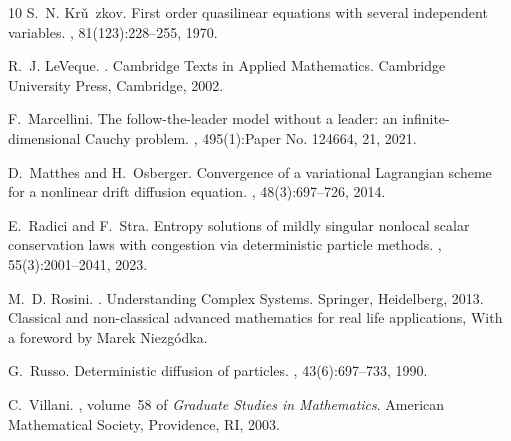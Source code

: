 \documentclass[reqno,oneside]{amsart}
\theoremstyle{plain}
\begin{document}
\begin{thebibliography}{10}
S.~N. Kru\v~zkov.
\newblock First order quasilinear equations with several independent variables.
, 81(123):228--255, 1970.

R.~J. LeVeque.
.
\newblock Cambridge Texts in Applied Mathematics. Cambridge University Press, Cambridge, 2002.

F.~Marcellini.
\newblock The follow-the-leader model without a leader: an infinite-dimensional {C}auchy problem.
, 495(1):Paper No. 124664, 21, 2021.

D.~Matthes and H.~Osberger.
\newblock Convergence of a variational {L}agrangian scheme for a nonlinear drift diffusion equation.
, 48(3):697--726, 2014.

E.~Radici and F.~Stra.
\newblock Entropy solutions of mildly singular nonlocal scalar conservation laws with congestion via deterministic particle methods.
, 55(3):2001--2041, 2023.

M.~D. Rosini.
.
\newblock Understanding Complex Systems. Springer, Heidelberg, 2013.
\newblock Classical and non-classical advanced mathematics for real life applications, With a foreword by Marek Niezg\'odka.

G.~Russo.
\newblock Deterministic diffusion of particles.
, 43(6):697--733, 1990.

C.~Villani.
, volume~58 of {\em Graduate Studies in Mathematics}.
\newblock American Mathematical Society, Providence, RI, 2003.

\end{thebibliography}
\end{document}

